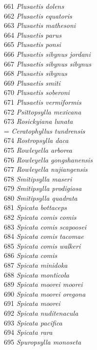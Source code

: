 \documentclass[
]{article}
\begin{document}
661 \emph{Plusaetis dolens}\\
662 \emph{Plusaetis equatoris}\\
663 \emph{Plusaetis mathesoni}\\
664 \emph{Plusaetis parus}\\
665 \emph{Plusaetis ponsi}\\
666 \emph{Plusaetis sibynus jordani}\\
667 \emph{Plusaetis sibynus sibynus}\\
668 \emph{Plusaetis sibynus}\\
669 \emph{Plusaetis smiti}\\
670 \emph{Plusaetis soberoni}\\
671 \emph{Plusaetis vermiformis}\\
672 \emph{Psittopsylla mexicana}\\
673 \emph{Rosickyiana lunata}\\
= \emph{Ceratophyllus tundrensis}\\
674 \emph{Rostropsylla daca}\\
675 \emph{Rowleyella arborea}\\
676 \emph{Rowleyella gongshanensis}\\
677 \emph{Rowleyella nujiangensis}\\
678 \emph{Smitipsylla maseri}\\
679 \emph{Smitipsylla prodigiosa}\\
680 \emph{Smitipsylla quadrata}\\
681 \emph{Spicata bottaceps}\\
682 \emph{Spicata comis comis}\\
683 \emph{Spicata comis scapoosei}\\
684 \emph{Spicata comis tacomae}\\
685 \emph{Spicata comis walkeri}\\
686 \emph{Spicata comis}\\
687 \emph{Spicata minidoka}\\
688 \emph{Spicata monticola}\\
689 \emph{Spicata moorei moorei}\\
690 \emph{Spicata moorei oregona}\\
691 \emph{Spicata moorei}\\
692 \emph{Spicata nuditenacula}\\
693 \emph{Spicata pacifica}\\
694 \emph{Spicata rara}\\
695 \emph{Spuropsylla monoseta}\\
\end{document}
